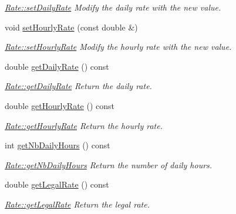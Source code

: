 \begin{DoxyCompactItemize}
\begin{DoxyCompactList}\small\item\em \hyperlink{classModels_1_1Rate_a2f07614aa1d1a4957fd8d4de4d3680d5}{Rate\+::set\+Daily\+Rate} Modify the daily rate with the new value. \end{DoxyCompactList}\item 
\hypertarget{classModels_1_1Rate_a75a770086f7ef9e702b961a32fc735b5}{}void \hyperlink{classModels_1_1Rate_a75a770086f7ef9e702b961a32fc735b5}{set\+Hourly\+Rate} (const double \&)\label{classModels_1_1Rate_a75a770086f7ef9e702b961a32fc735b5}

\begin{DoxyCompactList}\small\item\em \hyperlink{classModels_1_1Rate_a75a770086f7ef9e702b961a32fc735b5}{Rate\+::set\+Hourly\+Rate} Modify the hourly rate with the new value. \end{DoxyCompactList}\item 
double \hyperlink{classModels_1_1Rate_a937b0efecbc5b3561ad08fe712165d0b}{get\+Daily\+Rate} () const 
\begin{DoxyCompactList}\small\item\em \hyperlink{classModels_1_1Rate_a937b0efecbc5b3561ad08fe712165d0b}{Rate\+::get\+Daily\+Rate} Return the daily rate. \end{DoxyCompactList}\item 
double \hyperlink{classModels_1_1Rate_ac4c3d9c09bed20d639997da7d6c6798b}{get\+Hourly\+Rate} () const 
\begin{DoxyCompactList}\small\item\em \hyperlink{classModels_1_1Rate_ac4c3d9c09bed20d639997da7d6c6798b}{Rate\+::get\+Hourly\+Rate} Return the hourly rate. \end{DoxyCompactList}\item 
int \hyperlink{classModels_1_1Rate_a08add6d8b4db1b9a37a3f9cc22d0d0df}{get\+Nb\+Daily\+Hours} () const 
\begin{DoxyCompactList}\small\item\em \hyperlink{classModels_1_1Rate_a08add6d8b4db1b9a37a3f9cc22d0d0df}{Rate\+::get\+Nb\+Daily\+Hours} Return the number of daily hours. \end{DoxyCompactList}\item 
double \hyperlink{classModels_1_1Rate_aa06f56d236743c66b2e6b1bc772b9233}{get\+Legal\+Rate} () const 
\begin{DoxyCompactList}\small\item\em \hyperlink{classModels_1_1Rate_aa06f56d236743c66b2e6b1bc772b9233}{Rate\+::get\+Legal\+Rate} Return the legal rate. \end{DoxyCompactList}\end{DoxyCompactItemize}


